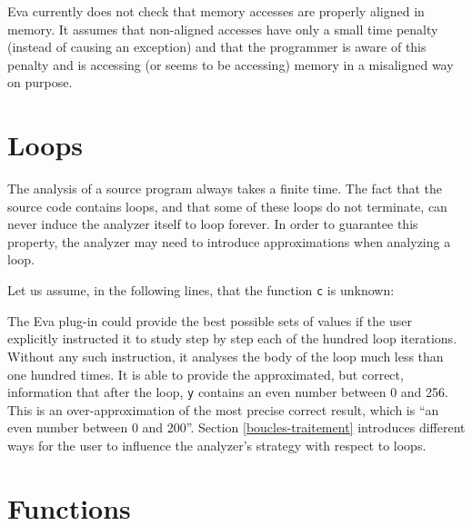 \documentclass[web]{frama-c-book}
\newcommand{\Eva}{\textsf{Eva}}
\begin{document}
\Eva{} currently does not check that memory accesses are 
properly aligned in memory. It assumes that non-aligned accesses have
only a small time penalty (instead of causing an exception) and that the
programmer is aware of this penalty and is accessing (or seems to be accessing)
memory in a misaligned way on purpose. %


\section{Loops}
\label{boucles}

The analysis of a source program always takes a finite time.
The fact that the source code contains loops, and that some of these
loops do not terminate, can never induce the analyzer itself to loop forever.
In order to guarantee this property, the analyzer may need to
introduce approximations when analyzing a loop.
\medskip

Let us assume, in the following lines, that the function \lstinline|c|
is unknown:

The \Eva{} plug-in could provide the best possible sets of values
if the user explicitly instructed it to study step by step each
of the hundred loop iterations. Without any such instruction, 
it analyses the body of the loop much less than
one hundred times. It is able to provide the approximated, but correct,
information that after the loop, \lstinline|y| contains an even number
between 0 and 256. This is an over-approximation of the most precise
correct result,
which is ``an even number between 0 and 200''.
Section \ref{boucles-traitement} introduces different ways for
the user to influence the analyzer's strategy with respect to
loops.

\section{Functions}\label{fonctions}
\end{document}
